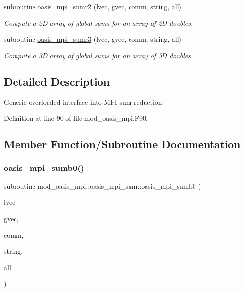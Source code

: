 \begin{DoxyCompactItemize}
subroutine \hyperlink{interfacemod__oasis__mpi_1_1oasis__mpi__sum_a45b443ca4b94c71ad7be5e6b653d8b1f}{oasis\+\_\+mpi\+\_\+sumr2} (lvec, gvec, comm, string, all)
\begin{DoxyCompactList}\small\item\em Compute a 2D array of global sums for an array of 2D doubles. \end{DoxyCompactList}\item 
subroutine \hyperlink{interfacemod__oasis__mpi_1_1oasis__mpi__sum_a31d24332ccc66502fcb78e5f69d19c45}{oasis\+\_\+mpi\+\_\+sumr3} (lvec, gvec, comm, string, all)
\begin{DoxyCompactList}\small\item\em Compute a 3D array of global sums for an array of 3D doubles. \end{DoxyCompactList}\end{DoxyCompactItemize}


\subsection{Detailed Description}
Generic overloaded interface into M\+PI sum reduction. 

Definition at line 90 of file mod\+\_\+oasis\+\_\+mpi.\+F90.



\subsection{Member Function/\+Subroutine Documentation}
\mbox{\label{interfacemod__oasis__mpi_1_1oasis__mpi__sum_a8d3b0d2544f1f360d83076b3d6dfe9e9}} 
\subsubsection{\texorpdfstring{oasis\+\_\+mpi\+\_\+sumb0()}{oasis\_mpi\_sumb0()}}
{\footnotesize\ttfamily subroutine mod\+\_\+oasis\+\_\+mpi\+::oasis\+\_\+mpi\+\_\+sum\+::oasis\+\_\+mpi\+\_\+sumb0 (\begin{DoxyParamCaption}\item[{integer(ip\+\_\+i8\+\_\+p), intent(in)}]{lvec,  }\item[{integer(ip\+\_\+i8\+\_\+p), intent(out)}]{gvec,  }\item[{integer(ip\+\_\+i4\+\_\+p), intent(in)}]{comm,  }\item[{character($\ast$), intent(in), optional}]{string,  }\item[{logical, intent(in), optional}]{all }\end{DoxyParamCaption})\hspace{0.3cm}{\ttfamily [private]}}



